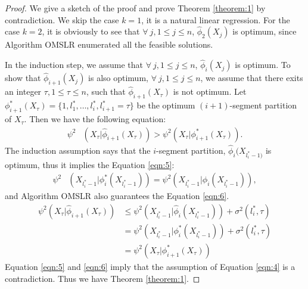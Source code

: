 \documentclass{article}
\begin{document}
\begin{proof}
  We give a sketch of the proof and prove Theorem \ref{theorem:1} by contradiction. We skip the case $k=1$, it is a natural linear regression. For the case $k=2$, it is obviously to see that $\forall~j, 1 \leq j \leq n$, $\hat \phi_{2}(X_j)$ is optimum, since Algorithm OMSLR enumerated all the feasible solutions.

  In the induction step, we assume that $\forall~j, 1 \leq j \leq n$, $\hat \phi_{i}(X_j)$ is optimum. To show that $\hat \phi_{i+1}(X_j)$ is also optimum, $\forall~j, 1 \leq j \leq n$, we assume that there exits an integer $\tau, 1 \leq \tau \leq n$, such that $\hat \phi_{i+1}(X_{\tau})$ is not optimum. Let $\phi_{i+1}^{*}(X_{\tau})=\{1, l^*_1, \dots, l^*_i, l^*_{i+1}=\tau\}$ be the optimum $(i+1)$-segment partition of $X_{\tau}$. Then we have the following equation:
  \begin{equation}\label{eqn:4}
    \begin{aligned}
      \psi^2&(X_{\tau} | \hat \phi_{i+1}(X_{\tau})) > \psi^2(X_{\tau} | \phi_{i+1}^*(X_{\tau})).
    \end{aligned}
  \end{equation}
The induction assumption says that the $i$-segment partition, $\hat \phi_{i}(X_{l^*_{i}-1)}$ is optimum, thus it implies the Equation \ref{eqn:5}:
  \begin{equation}\label{eqn:5}
    \begin{aligned}
      \psi^2&(X_{l^*_{i}-1} | \phi_{i}^*(X_{l^*_{i}-1})) = \psi^2(X_{l^*_{i}-1} | \hat \phi_{i}(X_{l^*_{i}-1})),
    \end{aligned}
  \end{equation}
  and Algorithm OMSLR also guarantees the Equation \ref{eqn:6}.
  \begin{equation}\label{eqn:6}
    \begin{aligned}
      \psi^2(X_{\tau} | \hat \phi_{i+1}(X_{\tau})) &\leq \psi^2(X_{l^*_{i}-1} | \hat \phi_{i}(X_{l^*_{i}-1})) + \sigma^2 (l^*_{i}, \tau) \\
      &= \psi^2(X_{l^*_{i}-1} | \phi_{i}^*(X_{l^*_{i}-1})) + \sigma^2 (l^*_{i}, \tau) \\
      &= \psi^2(X_{\tau} | \phi^*_{i+1}(X_{\tau}))
    \end{aligned}
  \end{equation}
  Equation \ref{eqn:5} and \ref{eqn:6} imply that the assumption of Equation \ref{eqn:4} is a contradiction. Thus we have Theorem \ref{theorem:1}.
\end{proof}
\end{document}
